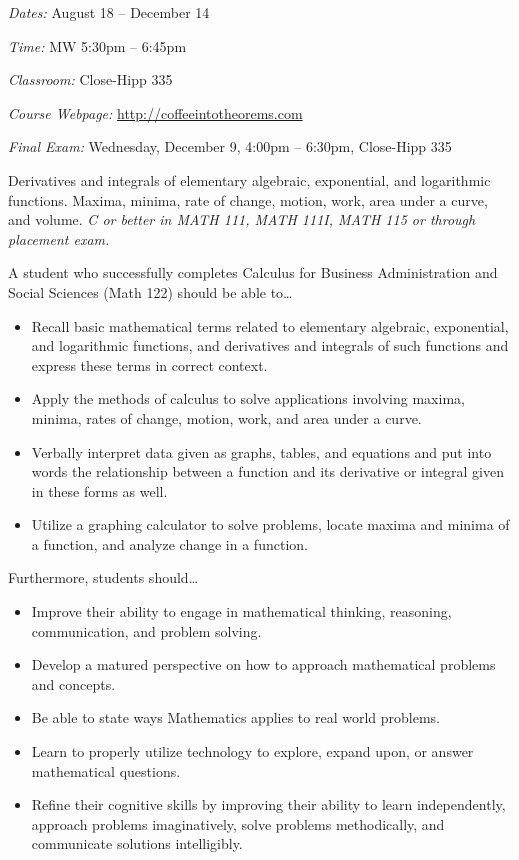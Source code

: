 \documentclass[11pt,letterpaper]{article}
\newcommand{\classdates}{August 18 -- December 14}
\newcommand{\classtimes}{MW 5:30pm -- 6:45pm}
\newcommand{\classroom}{Close-Hipp 335}
\newcommand{\website}{http://coffeeintotheorems.com}
\begin{document}
\textit{Dates:} \classdates \par
\textit{Time:} \classtimes \par
\textit{Classroom:} \classroom \par
\textit{Course Webpage:} \href{\website}{\website} \par
\textit{Final Exam:} Wednesday, December 9, 4:00pm -- 6:30pm, \classroom
\sectionbreak




Derivatives and integrals of elementary algebraic, exponential, and logarithmic functions. Maxima, minima, rate of change, motion, work, area under a curve, and volume. {\itshape C or better in MATH 111, MATH 111I, MATH 115 or through placement exam.}
\sectionbreak




A student who successfully completes Calculus for Business Administration and Social Sciences (Math 122) should be able to\dots
	\begin{itemize} \itemsep=0.3ex
	\item Recall basic mathematical terms related to elementary algebraic, exponential, and logarithmic functions, and derivatives and integrals of such functions and express these terms in correct context. 
	\item Apply the methods of calculus to solve applications involving maxima, minima, rates of change, motion, work, and area under a curve. 
	\item Verbally interpret data given as graphs, tables, and equations and put into words the relationship between a function and its derivative or integral given in these forms as well. 
	\item Utilize a graphing calculator to solve problems, locate maxima and minima of a function, and analyze change in a function. 
	\end{itemize}
Furthermore, students should\dots
	\begin{itemize} \itemsep=0.3ex
	\item  Improve their ability to engage in mathematical thinking, reasoning, communication, and problem solving.
	\item Develop a matured perspective on how to approach mathematical problems and concepts.
	\item Be able to state ways Mathematics applies to real world problems.
	\item Learn to properly utilize technology to explore, expand upon, or answer mathematical questions.
	\item Refine their cognitive skills by improving their ability to learn independently, approach problems imaginatively, solve problems methodically, and communicate solutions intelligibly.
	\end{itemize}
\par\vspace{0.6cm}
\end{document}
